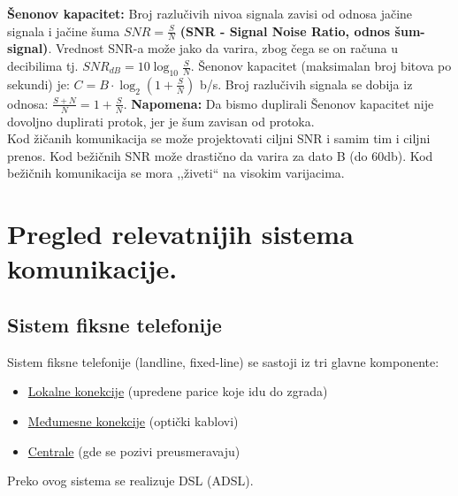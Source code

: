 \documentclass[a4paper]{article}
\begin{document}
    \textbf{Šenonov kapacitet:} Broj razlučivih nivoa signala zavisi od odnosa jačine signala i 
    jačine šuma $SNR = \frac{S}{N}$ \textbf{(SNR - Signal Noise Ratio, odnos šum-signal)}. 
    Vrednost SNR-a može jako da varira, zbog čega se on računa u decibilima tj. $SNR_{dB} = 10 \log_{10}{\frac{S}{N}}$. 
    Šenonov kapacitet (maksimalan broj bitova po sekundi) je: 
    $C = B\cdot \log_2{(1+\frac{S}{N})}$ b/s. Broj razlučivih signala se dobija 
    iz odnosa: $\frac{S+N}{N}=1+\frac{S}{N}$. \textbf{Napomena:} Da bismo duplirali Šenonov kapacitet nije
    dovoljno duplirati protok, jer je šum zavisan od protoka. \\
    \indent Kod žičanih komunikacija se može projektovati ciljni SNR i samim tim i ciljni prenos. Kod
    bežičnih SNR može drastično da varira za dato B (do 60db). Kod bežičnih komunikacija se mora
    ,,živeti`` na visokim varijacima. 

\section{Pregled relevatnijih sistema komunikacije.}
    \subsection{Sistem fiksne telefonije}
        \noindent Sistem fiksne telefonije (landline, fixed-line) se sastoji iz tri glavne komponente:
        \begin{itemize}
            \item \underline{Lokalne konekcije} (upredene parice koje idu do zgrada)
            \item \underline{Međumesne konekcije} (optički kablovi)
            \item \underline{Centrale} (gde se pozivi preusmeravaju)
        \end{itemize}
        Preko ovog sistema se realizuje DSL (ADSL).
\end{document}
